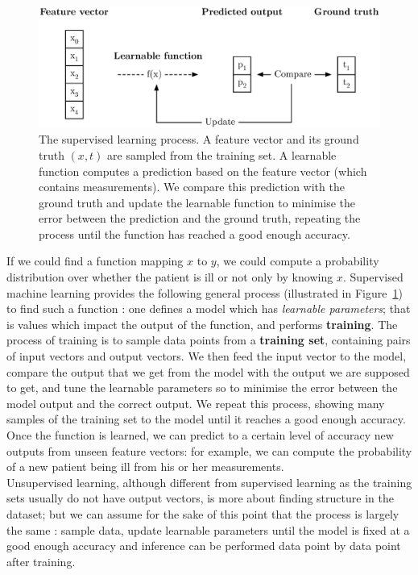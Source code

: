 \begin{figure}
	\centering
	\includegraphics[width=0.8\linewidth]{fig/supervised_ml.eps}
	\caption{The supervised learning process. A feature vector and its ground
	truth $(x, t)$ are sampled from the training set. A learnable
	function computes a prediction based on the feature vector (which 
	contains measurements). We compare this prediction with the ground 
	truth and update the learnable function to minimise the error
	between the prediction and the ground truth, repeating the process
	until the function has reached a good enough accuracy.}
	\label{fig:supervised_ml}
\end{figure}

If we could find a function mapping $x$ to $y$, we could compute a probability
distribution over whether the patient is ill or not only by knowing $x$. 
Supervised machine learning provides the following general process (illustrated
in Figure~\ref{fig:supervised_ml}) to find
such a function : one defines a model which has
\textit{learnable parameters}; that is values which impact the output of the
function, and performs \textbf{training}. The process of training is to
sample data points from a \textbf{training set}, containing pairs of input
vectors and output vectors. We then feed the input vector to the model, compare
the output that we get from the model with the output we are supposed to get,
and tune the learnable parameters so to minimise the error between the model
output and the correct output. We repeat this process, showing many samples
of the training set to the model until it reaches a good enough accuracy. Once
the function is learned, we can predict to a certain level of accuracy new 
outputs from unseen feature vectors: for example, we can compute the probability
of a new patient being ill from his or her measurements.\\

Unsupervised learning, although different from supervised learning as the
training sets usually do not have output vectors, is more about finding
structure in the dataset; but we can assume for the sake of this point that
the process is largely the same : sample data, update learnable parameters
until the model is fixed at a good enough accuracy and inference can be
performed data point by data point after training.\\

